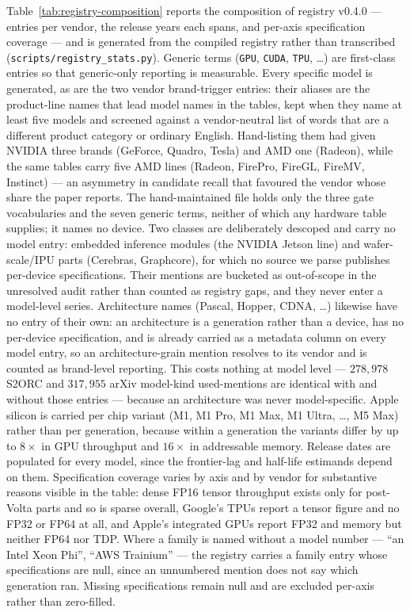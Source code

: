 
Table~\ref{tab:registry-composition} reports the composition of registry
v0.4.0 --- entries per vendor, the release years each spans, and per-axis
specification coverage --- and is generated from the compiled registry rather than
transcribed (\texttt{scripts/registry\_stats.py}). Generic terms (\texttt{GPU},
\texttt{CUDA}, \texttt{TPU}, \ldots) are first-class entries so that
generic-only reporting is measurable. Every specific model is generated, as are the two
vendor brand-trigger entries: their aliases are the product-line names that lead
model names in the tables, kept when they name at least five models and screened
against a vendor-neutral list of words that are a different product category or
ordinary English. Hand-listing them had given NVIDIA three brands (GeForce,
Quadro, Tesla) and AMD one (Radeon), while the same tables carry five AMD lines
(Radeon, FirePro, FireGL, FireMV, Instinct) --- an asymmetry in candidate recall
that favoured the vendor whose share the paper reports. The hand-maintained file
holds only the three gate vocabularies and the seven generic terms, neither of
which any hardware table supplies; it names no device.
Two classes are deliberately descoped and carry no model entry: embedded
inference modules (the NVIDIA Jetson line) and wafer-scale/IPU parts (Cerebras,
Graphcore), for which no source we parse publishes per-device specifications.
Their mentions are bucketed as out-of-scope in the unresolved audit rather than
counted as registry gaps, and they never enter a model-level series. Architecture
names (Pascal, Hopper, CDNA, \ldots) likewise have no entry of their own: an
architecture is a generation rather than a device, has no per-device
specification, and is already carried as a metadata column on every model entry,
so an architecture-grain mention resolves to its vendor and is counted as
brand-level reporting. This costs nothing at model level --- $278{,}978$ S2ORC and
$317{,}955$ arXiv model-kind used-mentions are identical with and without those
entries --- because an architecture was never model-specific.
Apple silicon is carried per chip variant (M1, M1 Pro, M1 Max, M1 Ultra, \ldots,
M5 Max) rather than per generation, because within a generation the variants
differ by up to $8\times$ in GPU throughput and $16\times$ in addressable memory.
Release dates are populated for every model, since the frontier-lag and
half-life estimands depend on them. Specification coverage varies by axis and by
vendor for substantive reasons visible in the table: dense FP16 tensor throughput
exists only for post-Volta parts and so is sparse overall, Google's TPUs report a
tensor figure and no FP32 or FP64 at all, and Apple's integrated GPUs report FP32
and memory but neither FP64 nor TDP. Where a family is named without a model
number --- ``an
Intel Xeon Phi'', ``AWS Trainium'' --- the registry carries a family entry whose
specifications are null, since an unnumbered mention does not say which
generation ran. Missing specifications remain null and are excluded
per-axis rather than zero-filled.


